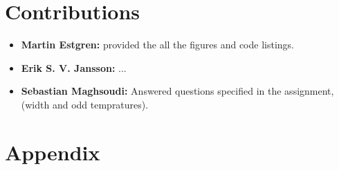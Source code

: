 \documentclass[a4paper, twocolumn]{article}
\begin{document}
    \section*{Contributions}

    \begin{itemize}
    	\item{\textbf{Martin Estgren:} provided the all the figures and code listings.}
    	\item{\textbf{Erik S. V. Jansson:} ...}
    	\item{\textbf{Sebastian Maghsoudi:} Answered questions specified in the assignment,(width and odd tempratures).}
    \end{itemize}

    \nocite{*} %
    
    
    \onecolumn \appendix
    \section*{Appendix}
 	


    
\end{document}
